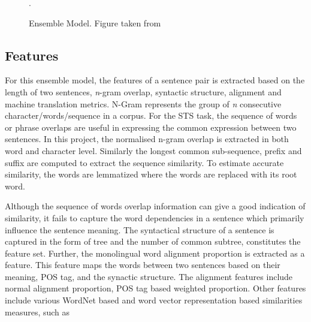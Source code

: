 \documentclass[12pt]{report} %
\begin{document}
	\begin{figure}[!tbp]
		\centering
		\caption{Ensemble Model. Figure taken from \cite{tian2017ecnu}}.
		\label{ensemble}
	\end{figure}
	
	\subsection{Features}
	For this ensemble model, the features of a sentence pair is extracted based on the length of two sentences, \textit{n}-gram overlap, syntactic structure, alignment and machine translation metrics. N-Gram represents the group of \textit{n} consecutive character/words/sequence in a corpus. For the STS task, the  sequence of words or phrase overlaps are useful in expressing the common expression between two sentences. In this project, the normalised n-gram overlap is extracted in both word and character level. Similarly the longest common sub-sequence, prefix and suffix are computed to extract the sequence similarity. To estimate accurate similarity, the words are lemmatized where the words are replaced with its root word. 
	
	Although the sequence of words overlap information can give a good indication of similarity, it fails to capture the word dependencies in a sentence which primarily influence the sentence meaning. The syntactical structure of a sentence is captured in the form of tree and the number of common subtree, constitutes the feature set. Further, the monolingual word alignment proportion is extracted as a feature. This feature maps the words between two sentences based on their meaning, POS tag, and the synactic structure. The alignment features include normal alignment proportion, POS tag based weighted proportion. Other features include various WordNet based and word vector representation based similarities measures, such as
	
\end{document}
